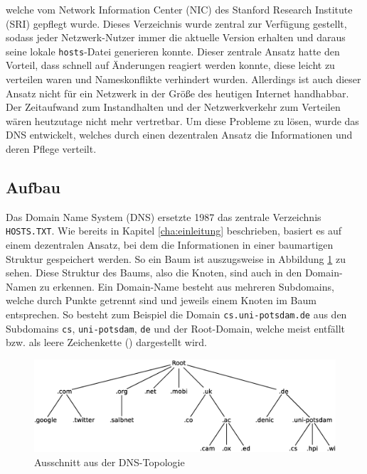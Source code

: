 \documentclass[a4paper, 12pt, BCOR10mm, DIV12, toc=bibliography, toc=listof, german]{scrbook}
\def \dns {Domain Name System (DNS)}
\begin{document}
			welche vom Network Information Center (NIC) des Stanford Research Institute (SRI) gepflegt
			wurde. Dieses Verzeichnis wurde zentral zur Verfügung gestellt, sodass jeder Netzwerk-Nutzer
			immer die aktuelle Version erhalten und daraus seine lokale \texttt{hosts}-Datei generieren
			konnte.  Dieser zentrale Ansatz hatte den Vorteil, dass schnell auf Änderungen reagiert werden
			konnte, diese leicht zu verteilen waren und Nameskonflikte verhindert wurden.  Allerdings ist
			auch dieser Ansatz nicht für ein Netzwerk in der Größe des heutigen Internet handhabbar.  Der
			Zeitaufwand zum Instandhalten und der Netzwerkverkehr zum Verteilen wären heutzutage nicht
			mehr vertretbar. Um diese Probleme zu lösen, wurde das DNS \cite{rfc1034} entwickelt, welches
			durch einen dezentralen Ansatz die Informationen und deren Pflege verteilt.

			


			\subsection{Aufbau} %
			\label{sub:aufbau}

			Das \dns{} ersetzte 1987 das zentrale Verzeichnis \texttt{HOSTS.TXT}. Wie bereits in Kapitel
			\ref{cha:einleitung} beschrieben, basiert es auf einem dezentralen Ansatz, bei dem die
			Informationen in einer baumartigen Struktur gespeichert werden. So ein Baum ist auszugsweise
			in Abbildung \ref{fig:dns-tree} zu sehen. Diese Struktur des Baums, also die Knoten, sind auch
			in den Domain-Namen zu erkennen. Ein Domain-Name besteht aus mehreren Subdomains, welche durch
			Punkte getrennt sind und jeweils einem Knoten im Baum entsprechen. So besteht zum Beispiel die
			Domain \texttt{cs.uni-potsdam.de} aus den Subdomains \texttt{cs}, \texttt{uni-potsdam},
			\texttt{de} und der Root-Domain, welche meist entfällt bzw. als leere Zeichenkette
			(\glqq{}\grqq{}) dargestellt wird.

			\begin{figure}
				\centering
				\includegraphics[width=\textwidth]{images/dns-tree-domains}
				\caption{Ausschnitt aus der DNS-Topologie} %
				\label{fig:dns-tree}
			\end{figure}
\end{document}
